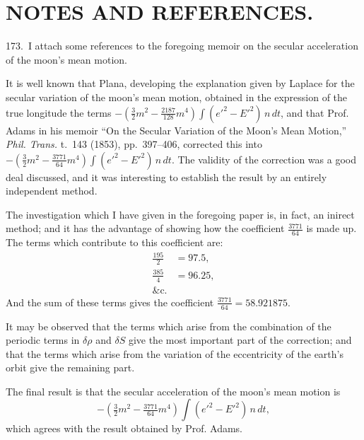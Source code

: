 \documentclass[11pt,a4paper]{book}
\providecommand{\mypar}{\par}
\begin{document}
{{\clearpage


\section*{NOTES AND REFERENCES.}

\medskip

\mypar
173.~I attach some references to the foregoing memoir on the secular
acceleration of the moon's mean motion.

\mypar
It is well known that Plana, developing the explanation given by Laplace for
the secular variation of the moon's mean motion, obtained in the expression of
the true longitude the terms $-\left(\frac{3}{2}m^2 - \frac{2187}{128}m^4\right)\int(e'^2 - E'^2)\,n\,dt$,
and that Prof. Adams in his memoir ``On the Secular Variation of the Moon's Mean
Motion,'' \textit{Phil. Trans.} t.~143 (1853), pp.~397--406, corrected this into
$-\left(\frac{3}{2}m^2 - \frac{3771}{64}m^4\right)\int(e'^2 - E'^2)\,n\,dt$.
The validity of the correction was a good deal discussed, and it was interesting
to establish the result by an entirely independent method.

\mypar
The investigation which I have given in the foregoing paper is, in fact, an
inirect method; and it has the advantage of showing how the coefficient
$\frac{3771}{64}$ is made up. The terms which contribute to this coefficient are:
\begin{align*}
\tfrac{195}{2} &= 97.5,\\
\tfrac{385}{4} &= 96.25,\\
\&\mathrm{c}.
\end{align*}
And the sum of these terms gives the coefficient $\frac{3771}{64} = 58.921875$.

\mypar
It may be observed that the terms which arise from the combination of the
periodic terms in $\delta\rho$ and $\delta S$ give the most important part of the
correction; and that the terms which arise from the variation of the
eccentricity of the earth's orbit give the remaining part.

\mypar
The final result is that the secular acceleration of the moon's mean motion is
\[
-\left(\tfrac{3}{2}m^2 - \tfrac{3771}{64}m^4\right)\int(e'^2 - E'^2)\,n\,dt,
\]
which agrees with the result obtained by Prof. Adams.

}}
\end{document}

